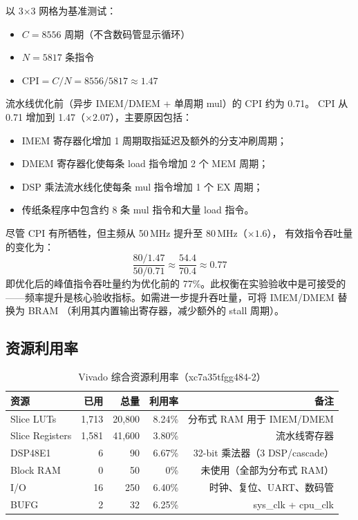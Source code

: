 \documentclass[12pt,a4paper]{ctexart}
\begin{document}
以 3×3 网格为基准测试：
\begin{itemize}[nosep]
  \item $C = 8556$ 周期（不含数码管显示循环）
  \item $N = 5817$ 条指令
  \item $\text{CPI} = C / N = 8556 / 5817 \approx 1.47$
\end{itemize}

流水线优化前（异步 IMEM/DMEM + 单周期 mul）的 CPI 约为 0.71。
CPI 从 0.71 增加到 1.47（$\times 2.07$），主要原因包括：
\begin{itemize}[nosep]
  \item IMEM 寄存器化增加 1 周期取指延迟及额外的分支冲刷周期；
  \item DMEM 寄存器化使每条 load 指令增加 2 个 MEM 周期；
  \item DSP 乘法流水线化使每条 mul 指令增加 1 个 EX 周期；
  \item 传纸条程序中包含约 8 条 mul 指令和大量 load 指令。
\end{itemize}

尽管 CPI 有所牺牲，但主频从 50\,MHz 提升至 80\,MHz（$\times 1.6$），
有效指令吞吐量的变化为：
\[
\frac{80/1.47}{50/0.71} \approx \frac{54.4}{70.4} \approx 0.77
\]
即优化后的峰值指令吞吐量约为优化前的 77\%。此权衡在实验验收中是可接受的
——频率提升是核心验收指标。如需进一步提升吞吐量，可将 IMEM/DMEM 替换为 BRAM
（利用其内置输出寄存器，减少额外的 stall 周期）。

\subsection{资源利用率}

\begin{table}[H]
\centering
\caption{Vivado 综合资源利用率（xc7a35tfgg484-2）}
\begin{tabular}{@{}lrrrr@{}}
\toprule
\textbf{资源} & \textbf{已用} & \textbf{总量} & \textbf{利用率} & \textbf{备注} \\
\midrule
Slice LUTs    & 1,713   & 20,800  & 8.24\%  & 分布式 RAM 用于 IMEM/DMEM \\
Slice Registers & 1,581 & 41,600  & 3.80\%  & 流水线寄存器 \\
DSP48E1       & 6       & 90      & 6.67\%  & 32-bit 乘法器（3 DSP/cascade） \\
Block RAM     & 0       & 50      & 0\%     & 未使用（全部为分布式 RAM） \\
I/O           & 16      & 250     & 6.40\%  & 时钟、复位、UART、数码管 \\
BUFG          & 2       & 32      & 6.25\%  & sys\_clk + cpu\_clk \\
\bottomrule
\end{tabular}
\label{tab:util}
\end{table}
\end{document}

